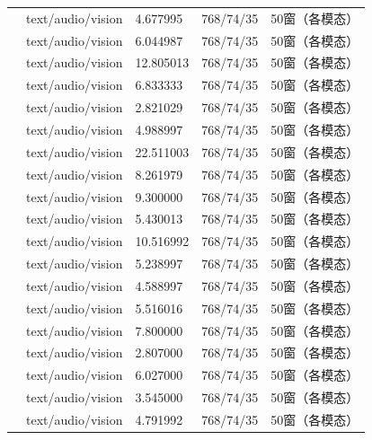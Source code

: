 \documentclass{gmcmthesis}
\begin{document}
\begin{longtable}{C{0.27\textwidth}C{0.16\textwidth}C{0.14\textwidth}C{0.14\textwidth}C{0.14\textwidth}}
\texttt{} & text/audio/vision & 4.677995 & 768/74/35 & 50窗（各模态） \\
\texttt{} & text/audio/vision & 6.044987 & 768/74/35 & 50窗（各模态） \\
\texttt{} & text/audio/vision & 12.805013 & 768/74/35 & 50窗（各模态） \\
\texttt{} & text/audio/vision & 6.833333 & 768/74/35 & 50窗（各模态） \\
\texttt{} & text/audio/vision & 2.821029 & 768/74/35 & 50窗（各模态） \\
\texttt{} & text/audio/vision & 4.988997 & 768/74/35 & 50窗（各模态） \\
\texttt{} & text/audio/vision & 22.511003 & 768/74/35 & 50窗（各模态） \\
\texttt{} & text/audio/vision & 8.261979 & 768/74/35 & 50窗（各模态） \\
\texttt{} & text/audio/vision & 9.300000 & 768/74/35 & 50窗（各模态） \\
\texttt{} & text/audio/vision & 5.430013 & 768/74/35 & 50窗（各模态） \\
\texttt{} & text/audio/vision & 10.516992 & 768/74/35 & 50窗（各模态） \\
\texttt{} & text/audio/vision & 5.238997 & 768/74/35 & 50窗（各模态） \\
\texttt{} & text/audio/vision & 4.588997 & 768/74/35 & 50窗（各模态） \\
\texttt{} & text/audio/vision & 5.516016 & 768/74/35 & 50窗（各模态） \\
\texttt{} & text/audio/vision & 7.800000 & 768/74/35 & 50窗（各模态） \\
\texttt{} & text/audio/vision & 2.807000 & 768/74/35 & 50窗（各模态） \\
\texttt{} & text/audio/vision & 6.027000 & 768/74/35 & 50窗（各模态） \\
\texttt{} & text/audio/vision & 3.545000 & 768/74/35 & 50窗（各模态） \\
\texttt{} & text/audio/vision & 4.791992 & 768/74/35 & 50窗（各模态） \\

\end{longtable}
\end{document}
